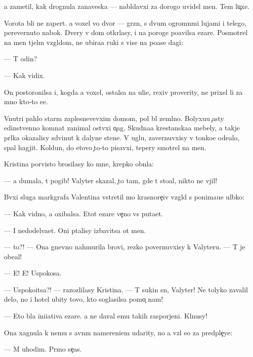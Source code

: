 \documentclass[10pt]{book}
\begin{document}
{\Y}a zametil, kak drognula zanaveska — nabl{\iu}davxi{\y} za dorogo{\y} uvidel men{\ia}. Tem lu{\c}xe.

Vorota b{\yi}li ne zapert{\yi}. {\Y}a voxel vo dvor — gr{\ia}zn{\yi}{\y}, s dvum{\ia} ogromn{\yi}mi lujami i telego{\y}, perevernuto{\y} nabok. Dvery v dom otkr{\yi}lasy, i na poroge po{\y}avilsa {\C}ezare. Posmotrel na men{\ia} t{\ia}jel{\yi}m vzgl{\ia}dom, ne ubira{\y}a ruki s vis{\ia}{\x}e{\y} na po{\y}ase dagi:

— T{\yi} odin?

— Kak vidix.

On postoronilsa i, kogda {\y}a voxel, ostalsa na uli{\q}e, rexiv proverity, ne prixel li za mno{\y} kto-to {\y}e{\x}e.

Vnutri pahlo star{\yi}m zaplesnevevxim domom, pol b{\yi}l zeml{\ia}no{\y}. Bolyxu{\y}u {\c}asty {\y}edinstvenno{\y} komnat{\yi} zanimal ost{\yi}vxi{\y} o{\c}ag. Skudna{\y}a krest{\y}anska{\y}a mebely, a takje pr{\ia}lka okazalisy sdvinut{\yi} k dalyne{\y} stene. V uglu, zavernuvxisy v tonko{\y}e ode{\y}alo, spal hagjit. Koldun, do etovo {\c}to-to pisavxi{\y}, tepery smotrel na men{\ia}.

Kristina por{\yi}visto brosilasy ko mne, krepko obn{\ia}la:

— {\Y}a dumala, t{\yi} pogib! Valyter skazal, {\c}to tam, gde t{\yi} sto{\y}al, nikto ne v{\yi}jil!

B{\yi}vxi{\y} sluga markgrafa Valentina vstretil mo{\y} krasnore{\c}iv{\yi}{\y} vzgl{\ia}d s ponima{\y}u{\x}e{\y} ul{\yi}bko{\y}:

— Kak vidno, {\y}a oxibalsa. Etot {\C}ezare ve{\c}no vs{\e} puta{\y}et.

— I nedodel{\yi}va{\y}et. Oni p{\yi}talisy izbavitsa ot men{\ia}.

— {\C}to?! — Ona gnevno nahmurila brovi, rezko povernuvxisy k Valyteru. — T{\yi} je obe{\x}al!

— E{\y}! E{\y}! Uspoko{\y}sa.

— Uspoko{\y}itsa?! — razozlilasy Kristina. — T{\yi} sukin s{\yi}n, Valyter! Ne tolyko zavalil delo, no i hotel ubity tovo, kto soglasilsa pomo{\c} nam!

— Eto b{\yi}la ini{\q}iativa {\C}ezare. {\Y}a ne daval {\y}emu takih raspor{\ia}jeni{\y}. Kl{\ia}nusy!

Ona xagnula k nemu s {\y}avn{\yi}m namereni{\y}em udarity, no {\y}a vz{\ia}l {\y}e{\y}o za predple{\c}ye:

— M{\yi} uhodim. Pr{\ia}mo se{\y}{\c}as.
\end{document}
